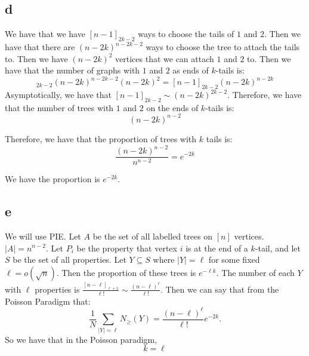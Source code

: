 \documentclass[]{article}
\begin{document}
\subsection{d}

We have that we have $[n - 1]_{2k - 2}$ ways to choose the tails of $1$ and $2$. Then we have that there are $(n- 2k)^{n - 2k - 2}$ ways to choose the tree to attach the tails to. Then we have $(n - 2k)^2$ vertices that we can attach $1 $ and $2$ to. Then we have that the number of graphs with $1$ and $2$ as ends of $k$-tails is:
\begin{equation}
	[n - 1]_{2k - 2} (n - 2k)^{n - 2k - 2}(n - 2k)^2 = [n - 1]_{2k - 2} (n - 2k)^{n - 2k}
\end{equation}
Asymptotically, we have that $[n - 1]_{2k - 2} \sim (n - 2k)^{2k - 2}$. Therefore, we have that the number of trees with $1$ and $2$ on the ends of $k$-tails is:
\begin{equation}
	(n - 2k)^{n - 2}
\end{equation}

Therefore, we have that the proportion of trees with $k$ tails is:
\begin{equation}
	\frac{(n - 2k)^{n - 2}}{n^{n - 2}} = e^{-2k}
\end{equation}

We have the proportion is $e^{-2k}$. 

\subsection{e}
We will use PIE. Let $A$ be the set of all labelled trees on $[n]$ vertices. $|A| = n^{n - 2}$. Let $P_i$ be the property that vertex $i$ is at the end of a $k$-tail, and let $S$ be the set of all properties. Let $Y \subseteq S$ where $|Y| = \ell$ for some fixed $\ell = o(\sqrt{n}) $. Then the proportion of these trees is $e^{-\ell k}$. The number of each $Y$ with $\ell$ properties is $\frac{[n - \ell]_{\ell + 1}}{\ell!} \sim \frac{(n - \ell)^\ell}{\ell!}$. Then we can say that from the Poisson Paradigm that:
\begin{equation}
	\frac{1}{N}\sum_{|Y| = \ell}N_\geq(Y) = \frac{(n - \ell)^\ell}{\ell!} e^{-2k}.
\end{equation}
So we have that in the Poisson paradigm,
\begin{equation}
	k = \ell
	
\end{equation}
\end{document}
